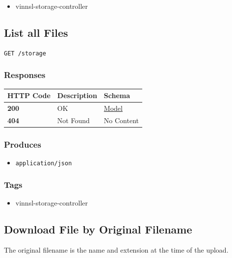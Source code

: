 \begin{itemize}
\tightlist
\item
  vinnsl-storage-controller
\end{itemize}

\subsection{List all Files}\label{list-all-files}

\begin{verbatim}
GET /storage
\end{verbatim}

\subsubsection{Responses}\label{responses-16}

\begin{longtable}[]{@{}lll@{}}
\toprule
HTTP Code & Description & Schema\tabularnewline
\midrule
\endhead
\textbf{200} & OK & \protect\hyperlink{model}{Model}\tabularnewline
\textbf{404} & Not Found & No Content\tabularnewline
\bottomrule
\end{longtable}

\subsubsection{Produces}\label{produces-16}

\begin{itemize}
\tightlist
\item
  \texttt{application/json}
\end{itemize}

\subsubsection{Tags}\label{tags-16}

\begin{itemize}
\tightlist
\item
  vinnsl-storage-controller
\end{itemize}

\subsection{Download File by Original
Filename}\label{download-file-by-original-filename}

The original filename is the name and extension at the time of the
upload.

